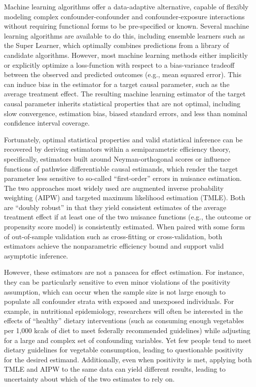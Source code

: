 \documentclass[12pt]{article}
\begin{document}
Machine learning algorithms offer a data-adaptive alternative, capable of flexibly modeling complex confounder-confounder and confounder-exposure interactions without requiring functional forms to be pre-specified or known. Several machine learning algorithms are available to do this,\cite{Hastie2009} including ensemble learners such as the Super Learner, which optimally combines predictions from a library of candidate algorithms.\cite{Laan2007} However, most machine learning methods either implicitly or explicitly optimize a loss-function with respect to a bias-variance tradeoff between the observed and predicted outcomes (e.g., mean squared error). This can induce bias in the estimator for a target causal parameter, such as the average treatment effect. The resulting machine learning estimator of the target causal parameter inherits statistical properties that are not optimal, including slow convergence, estimation bias, biased standard errors, and less than nominal confidence interval coverage.\cite{Kennedy2024, Diaz2020} 

Fortunately, optimal statistical properties and valid statistical inference can be recovered by deriving estimators within a semiparametric efficiency theory, specifically, estimators built around Neyman-orthogonal scores or influence functions of pathwise differentiable causal estimands, which render the target parameter less sensitive to so-called ``first-order'' errors in nuisance estimation.\cite{Chen2026} The two approaches most widely used are augmented inverse probability weighting (AIPW)\cite{Robins1994} and targeted maximum likelihood estimation (TMLE).\cite{vanderLaan2006} Both are ``doubly robust'' in that they yield consistent estimates of the average treatment effect if at least one of the two nuisance functions (e.g., the outcome or propensity score model) is consistently estimated. When paired with some form of out-of-sample validation such as cross-fitting or cross-validation, both estimators achieve the nonparametric efficiency bound and support valid asymptotic inference.\cite{Kennedy2024}

However, these estimators are not a panacea for effect estimation. For instance, they can be particularly sensitive to even minor violations of the positivity assumption,\cite{Rudolph2022} which can occur when the sample size is not large enough to populate all confounder strata with exposed and unexposed individuals.\cite{Westreich2010,Petersen2012} For example, in nutritional epidemiology, researchers will often be interested in the effects of ``healthy'' dietary interventions (such as consuming enough vegetables per 1,000 kcals of diet to meet federally recommended guidelines) while adjusting for a large and complex set of confounding variables. Yet few people tend to meet dietary guidelines for vegetable consumption,\cite{Bodnar2023a} leading to questionable positivity for the desired estimand. Additionally, even when positivity is met, applying both TMLE and AIPW to the same data can yield different results, leading to uncertainty about which of the two estimates to rely on.
\end{document}
